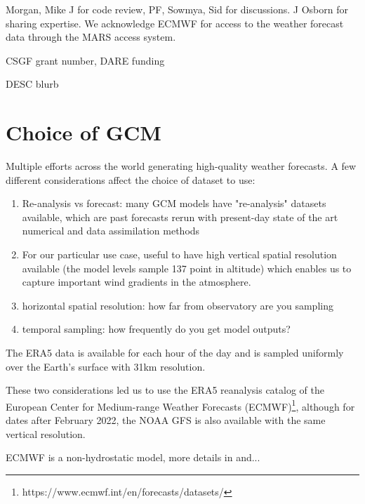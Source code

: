 \documentclass[twocolumn]{aastex631}
\begin{document}
\begin{acknowledgments}
Morgan, Mike J for code review, PF, Sowmya, Sid for discussions. J Osborn for sharing expertise. We acknowledge ECMWF for access to the weather forecast data through the MARS access system.

CSGF grant number, DARE funding

DESC blurb
\end{acknowledgments}

\vspace{5mm}




\appendix
\section{Choice of GCM}\label{app:gcm}
Multiple efforts across the world generating high-quality weather forecasts. 
A few different considerations affect the choice of dataset to use:
\begin{enumerate}
    \item Re-analysis vs forecast: many GCM models have "re-analysis" datasets available, which are past forecasts rerun with present-day state of the art numerical and data assimilation methods
    \item For our particular use case, useful to have high vertical spatial resolution available (the model levels sample 137 point in altitude) which enables us to capture important wind gradients in the atmosphere.
    \item horizontal spatial resolution: how far from observatory are you sampling
    \item temporal sampling: how frequently do you get model outputs?
\end{enumerate}

The ERA5 data is available for each hour of the day and is sampled uniformly over the Earth's surface with 31km resolution. 

These two considerations led us to use the ERA5 reanalysis catalog of the European Center for Medium-range Weather Forecasts (ECMWF)\footnote{https://www.ecmwf.int/en/forecasts/datasets/}, although for dates after February 2022, the NOAA GFS is also available with the same vertical resolution.

ECMWF is a non-hydrostatic model, more details in \cite{osborn_atmospheric_2018} and...


{}



\end{document}
